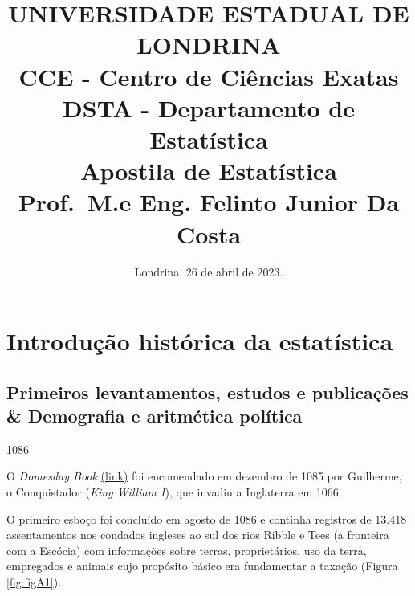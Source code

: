 \documentclass[
]{book}
\title{UNIVERSIDADE ESTADUAL DE LONDRINA\\
CCE - Centro de Ciências Exatas\\
DSTA - Departamento de Estatística\\
Apostila de Estatística\\
Prof.~M.e Eng. Felinto Junior Da Costa}
\author{}
\date{\vspace{-2.5em}Londrina, 26 de abril de 2023.}
\begin{document}
\maketitle

{
\setcounter{tocdepth}{1}
\tableofcontents
}
\hypertarget{section}{%
\chapter*{}\label{section}}

\hypertarget{introduuxe7uxe3o-histuxf3rica-da-estatuxedstica}{%
\chapter{Introdução histórica da estatística}\label{introduuxe7uxe3o-histuxf3rica-da-estatuxedstica}}

\hypertarget{primeiros-levantamentos-estudos-e-publicauxe7uxf5es-demografia-e-aritmuxe9tica-poluxedtica}{%
\section{Primeiros levantamentos, estudos e publicações \& Demografia e aritmética política}\label{primeiros-levantamentos-estudos-e-publicauxe7uxf5es-demografia-e-aritmuxe9tica-poluxedtica}}

1086

\hfill\break

O \emph{Domesday Book} \href{http://www.nationalarchives.gov.uk/education/resources/domesday-book/}{(link)}
foi encomendado em dezembro de 1085 por Guilherme, o Conquistador (\emph{King William I}), que invadiu a Inglaterra em 1066.

O primeiro esboço foi concluído em agosto de 1086 e continha registros de 13.418 assentamentos nos condados ingleses ao sul dos rios Ribble e Tees (a fronteira com a Escócia) com informações sobre terras, proprietários, uso da terra, empregados e animais cujo propósito básico era fundamentar a taxação (Figura \ref{fig:figA1}).

\hfill\break
\end{document}
